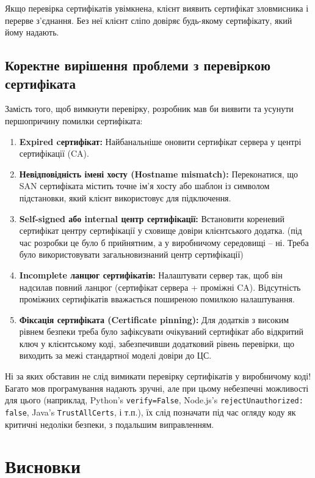 Якщо перевірка сертифікатів увімкнена, клієнт виявить сертифікат зловмисника і перерве з'єднання. Без неї клієнт 
сліпо довіряє будь-якому сертифікату, який йому надають.

\subsection*{Коректне вирішення проблеми з перевіркою сертифіката}

Замість того, щоб вимкнути перевірку, розробник мав би виявити та усунути першопричину помилки сертифіката:

\begin{enumerate}
    \item \textbf{Expired cертифікат:} Найбанальніше оновити сертифікат сервера у центрі сертифікації (CA).
    \item \textbf{Невідповідність імені хосту (Hostname mismatch):} Переконатися, що SAN сертифіката містить точне 
        ім'я хосту або шаблон із символом підстановки, який клієнт використовує для підключення.
    \item \textbf{Self-signed або internal центр сертифікації:} Встановити кореневий сертифікат центру сертифікації 
        у сховище довіри клієнтського додатка. (під час розробки це було б прийнятним, а у виробничому середовищі --
        ні. Треба було використовувати загальновизнаний центр сертифікації)
    \item \textbf{Incomplete ланцюг сертифікатів:} Налаштувати сервер так, щоб він надсилав повний ланцюг (сертифікат 
        сервера + проміжні CA). Відсутність проміжних сертифікатів вважається поширеною помилкою налаштування.
    \item \textbf{Фіксація сертифіката (Certificate pinning):} Для додатків з високим рівнем безпеки треба було 
        зафіксувати очікуваний сертифікат або відкритий ключ у клієнтському коді, забезпечивши додатковий рівень 
        перевірки, що виходить за межі стандартної моделі довіри до ЦС.
\end{enumerate}

\noindent Ні за яких обставин не слід вимикати перевірку сертифікатів у виробничому коді! Багато мов програмування 
надають зручні, але при цьому небезпечні можливості для цього (наприклад, Python's \texttt{verify=False}, Node.js's 
\texttt{rejectUnauthorized: false}, Java's \texttt{TrustAllCerts}, і т.п.), їх слід позначати під час огляду коду 
як критичні недоліки безпеки, з подальшим виправленням.

\section{Висновки}
\label{sec:conclusions}

